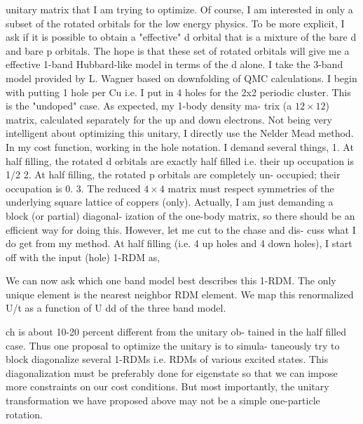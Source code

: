 \documentclass[prl,12pt,onecolumn,nofootinbib,notitlepage,english,superscriptaddress]{revtex4-1}
\begin{document}
unitary matrix that I am trying to optimize.  Of course, I am
interested in only a subset of the rotated orbitals for the low
energy physics.  To be more explicit, I ask if it is possible to
obtain a "effective"
d
orbital that is a mixture of the bare d and
bare p orbitals.  The hope is that these set of rotated orbitals
will give me a effective 1-band Hubbard-like model in terms
of the d
alone.
I take the 3-band model provided by L. Wagner based on
downfolding of QMC calculations. I begin with putting 1 hole
per Cu i.e.  I put in 4 holes for the 2x2 periodic cluster.  This
is the "undoped" case.  As expected, my 1-body density ma-
trix (a $12\times12$) matrix, calculated separately for the up and
down electrons.  Not being very intelligent about optimizing
this unitary,  I directly use the Nelder Mead method.  In my
cost function, working in the hole notation. I demand several
things,
1. At half filling, the rotated d orbitals are exactly half filled
i.e. their up occupation is 1/2
2.  At half filling, the rotated p orbitals are completely un-
occupied; their occupation is 0.
3. The reduced $4\times4$
matrix must respect symmetries of the
underlying square lattice of coppers (only).
Actually, I am just demanding a block (or partial) diagonal-
ization of the one-body matrix, so there should be an efficient
way for doing this.  However, let me cut to the chase and dis-
cuss what I do get from my method.
At half filling (i.e.
4 up holes and 4
down holes), I start off
with the input (hole) 1-RDM as,

We  can  now  ask  which  one  band  model  best  describes
this 1-RDM. The only unique element is the nearest neighbor
RDM element.  We map this renormalized
U/t
as a function
of
U
dd
of the three band model.
%

ch is about 10-20 percent different from the unitary ob-
tained in the half filled case.
Thus  one  proposal  to  optimize  the  unitary  is  to  simula-
taneously  try  to  block  diagonalize  several  1-RDMs  i.e. RDMs 
of various excited states.  This diagonalization must
be preferably done for eigenstate so that we can impose more
constraints on our cost conditions.  But most importantly, the
unitary transformation we have proposed above may not be a
simple one-particle rotation.
\end{document}
